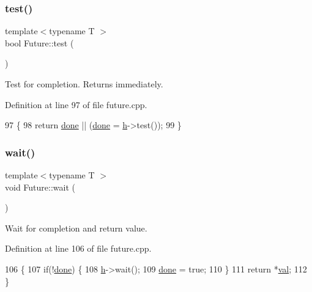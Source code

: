 \subsubsection{\texorpdfstring{test()}{test()}}
{\footnotesize\ttfamily template$<$typename T $>$ \\
bool Future\+::test (\begin{DoxyParamCaption}{ }\end{DoxyParamCaption})}

Test for completion. Returns immediately. 

Definition at line 97 of file future.\+cpp.


\begin{DoxyCode}
97                      \{
98     \textcolor{keywordflow}{return} \hyperlink{structshark_1_1_future_ae873cf93e919c066f04ff337ce3a21e1}{done} || (\hyperlink{structshark_1_1_future_ae873cf93e919c066f04ff337ce3a21e1}{done} = \hyperlink{structshark_1_1_future_a54f00db085adbffb18b2e2ab9e3d4b32}{h}->test());
99 \}
\end{DoxyCode}
\hypertarget{structshark_1_1_future_a88a411b5cedec34af07b054d15deedc2}{}\label{structshark_1_1_future_a88a411b5cedec34af07b054d15deedc2} 
\subsubsection{\texorpdfstring{wait()}{wait()}}
{\footnotesize\ttfamily template$<$typename T $>$ \\
void Future\+::wait (\begin{DoxyParamCaption}{ }\end{DoxyParamCaption})}

Wait for completion and return value. 

Definition at line 106 of file future.\+cpp.


\begin{DoxyCode}
106                          \{
107     \textcolor{keywordflow}{if}(!\hyperlink{structshark_1_1_future_ae873cf93e919c066f04ff337ce3a21e1}{done}) \{
108         \hyperlink{structshark_1_1_future_a54f00db085adbffb18b2e2ab9e3d4b32}{h}->wait();
109         \hyperlink{structshark_1_1_future_ae873cf93e919c066f04ff337ce3a21e1}{done} = \textcolor{keyword}{true};
110     \}
111     \textcolor{keywordflow}{return} *\hyperlink{structshark_1_1_future_ad47e70b84ce6303568af0bd6aca991da}{val};
112 \}
\end{DoxyCode}


